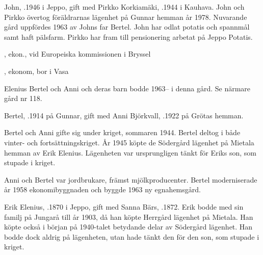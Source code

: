 


John, .1946 i Jeppo, gift med Pirkko Korkiamäki, .1944 i Kauhava. John och Pirkko övertog föräldrarnas lägenhet på Gunnar hemman år 1978. Nuvarande gård uppfördes 1963 av Johns far Bertel. John har odlat potatis och spannmål samt haft pälsfarm. Pirkko har fram till pensionering arbetat på Jeppo Potatis.

\begin{jhchildren}
  \item {}, ekon., vid Europeiska kommissionen i Bryssel
  \item {}, ekonom, bor i Vasa
\end{jhchildren}


Elenius Bertel och Anni och deras barn bodde 1963-- i denna gård. Se närmare gård nr 118.\jhvspace{}





Bertel, .1914 på Gunnar, gift med Anni Björkvall, .1922 på Grötas hemman.
\begin{jhchildren}
  \item {}
  \item {}
\end{jhchildren}

Bertel och Anni gifte sig under kriget, sommaren 1944. Bertel deltog i både vinter- och fortsättningskriget. År 1945 köpte de Södergård lägenhet på Mietala hemman av Erik Elenius. Lägenheten var ursprungligen tänkt för Eriks son, som stupade i kriget.

Anni och Bertel var jordbrukare, främst mjölkproducenter. Bertel moderniserade år 1958 ekonomibyggnaden och byggde 1963 ny egnahemsgård.


Erik Elenius, .1870 i Jeppo, gift med Sanna Bärs, .1872. Erik bodde med sin familj på Jungarå till år 1903, då han köpte Herrgård lägenhet på Mietala. Han köpte också i början på 1940-talet betydande delar av Södergård lägenhet. Han bodde dock aldrig på lägenheten, utan hade tänkt den för den son, som stupade i kriget.

